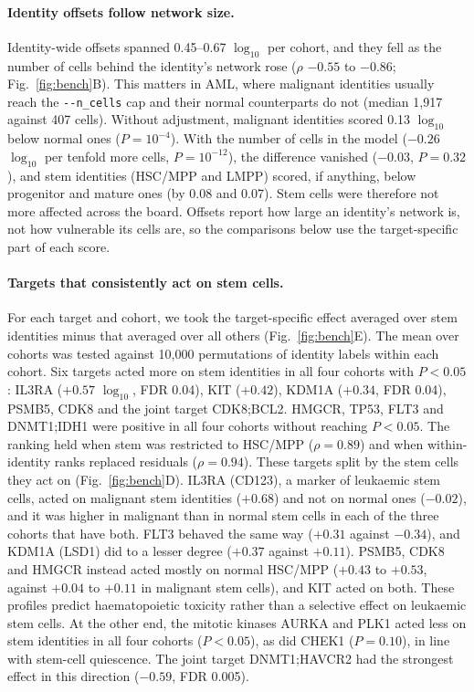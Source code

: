\documentclass[unnumsec,webpdf,contemporary,large]{oup-authoring-template}
\newcommand{\param}[1]{\texttt{-{}-#1}}
\begin{document}
\paragraph{Identity offsets follow network size.} Identity-wide offsets spanned 0.45--0.67 $\log_{10}$ per cohort, and they fell as the number of cells behind the identity's network rose ($\rho$ $-0.55$ to $-0.86$; Fig.~\ref{fig:bench}B). This matters in AML, where malignant identities usually reach the \param{n\_cells} cap and their normal counterparts do not (median 1,917 against 407 cells). Without adjustment, malignant identities scored 0.13 $\log_{10}$ below normal ones ($P=10^{-4}$). With the number of cells in the model ($-0.26$ $\log_{10}$ per tenfold more cells, $P=10^{-12}$), the difference vanished ($-0.03$, $P=0.32$), and stem identities (HSC/MPP and LMPP) scored, if anything, below progenitor and mature ones (by 0.08 and 0.07). Stem cells were therefore not more affected across the board. Offsets report how large an identity's network is, not how vulnerable its cells are, so the comparisons below use the target-specific part of each score.

\paragraph{Targets that consistently act on stem cells.} For each target and cohort, we took the target-specific effect averaged over stem identities minus that averaged over all others (Fig.~\ref{fig:bench}E). The mean over cohorts was tested against 10,000 permutations of identity labels within each cohort. Six targets acted more on stem identities in all four cohorts with $P<0.05$: IL3RA ($+0.57$ $\log_{10}$, FDR 0.04), KIT ($+0.42$), KDM1A ($+0.34$, FDR 0.04), PSMB5, CDK8 and the joint target CDK8;BCL2. HMGCR, TP53, FLT3 and DNMT1;IDH1 were positive in all four cohorts without reaching $P<0.05$. The ranking held when stem was restricted to HSC/MPP ($\rho=0.89$) and when within-identity ranks replaced residuals ($\rho=0.94$). These targets split by the stem cells they act on (Fig.~\ref{fig:bench}D). IL3RA (CD123), a marker of leukaemic stem cells, acted on malignant stem identities ($+0.68$) and not on normal ones ($-0.02$), and it was higher in malignant than in normal stem cells in each of the three cohorts that have both. FLT3 behaved the same way ($+0.31$ against $-0.34$), and KDM1A (LSD1) did to a lesser degree ($+0.37$ against $+0.11$). PSMB5, CDK8 and HMGCR instead acted mostly on normal HSC/MPP ($+0.43$ to $+0.53$, against $+0.04$ to $+0.11$ in malignant stem cells), and KIT acted on both. These profiles predict haematopoietic toxicity rather than a selective effect on leukaemic stem cells. At the other end, the mitotic kinases AURKA and PLK1 acted less on stem identities in all four cohorts ($P<0.05$), as did CHEK1 ($P=0.10$), in line with stem-cell quiescence. The joint target DNMT1;HAVCR2 had the strongest effect in this direction ($-0.59$, FDR 0.005).
\end{document}
